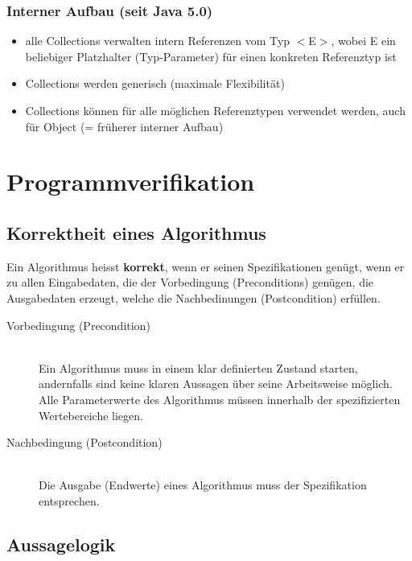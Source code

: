 \documentclass[a4paper,10pt]{article}
\newcommand{\Bold}[1]{\textbf{#1}} %
\begin{document}
\subsubsection{Interner Aufbau (seit Java 5.0)}
\begin{itemize}
	\item alle Collections verwalten intern Referenzen vom Typ $<$E$>$, wobei E ein beliebiger Platzhalter (Typ-Parameter) f\"ur einen konkreten Referenztyp ist
	\item Collections werden generisch (maximale Flexibilit\"at)
	\item Collections k\"onnen f\"ur alle m\"oglichen Referenztypen verwendet werden, auch
f\"ur Object (= fr\"uherer interner Aufbau)
\end{itemize}

\newpage
\section{Programmverifikation}
\subsection{Korrektheit eines Algorithmus}
Ein Algorithmus heisst \Bold {korrekt}, wenn er seinen Spezifikationen gen\"ugt, wenn er zu allen Eingabedaten, die der Vorbedingung (Preconditions) gen\"ugen, die Ausgabedaten erzeugt, welche die Nachbedinungen (Postcondition) erf\"ullen. 
\begin{description}
	\item[Vorbedingung (Precondition)] \hfill \\
		Ein Algorithmus muss in einem klar definierten Zustand starten, andernfalls sind keine klaren Aussagen \"uber seine Arbeitsweise m\"oglich. Alle Parameterwerte des Algorithmus m\"ussen innerhalb der spezifizierten Wertebereiche liegen.
	\item[Nachbedingung (Postcondition)] \hfill \\
		Die Ausgabe (Endwerte) eines Algorithmus muss der Spezifikation entsprechen.
\end{description}

\subsection{Aussagelogik}
\end{document}
